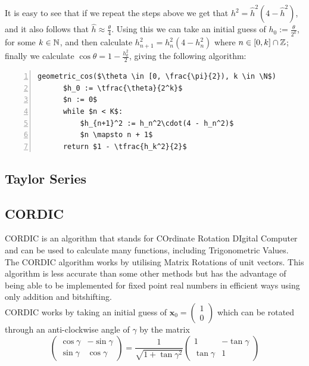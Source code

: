It is easy to see that if we repeat the steps above we get that \(h^2 = \hat{h}^2(4 - \hat{h}^2)\), and it also follows that \(\hat{h} \approx \frac{\theta}{4}\). Using this we can take an initial guess of \(h_0 := \frac{\theta}{2^k}\), for some \(k \in \mathbb{N}\), and then calculate \(h_{n+1}^2 = h_n^2(4 - h_n^2)\) where \(n \in [0, k] \cap \mathbb{Z}\); finally we calculate \(\cos\theta = 1 - \frac{h_k^2}{2}\), giving the following algorithm:
  
\begin{lstlisting}[numbers=left,frame=single,mathescape,caption={Geometric calculation of \(\cos\)},label={PCD_"Gometric Cos"}]
  geometric_cos($\theta \in [0, \frac{\pi}{2}), k \in \N$)
      $h_0 := \tfrac{\theta}{2^k}$
      $n := 0$
      while $n < K$:
          $h_{n+1}^2 := h_n^2\cdot(4 - h_n^2)$
          $n \mapsto n + 1$
      return $1 - \tfrac{h_k^2}{2}$
\end{lstlisting}

\subsection{Taylor Series}
\subsection{CORDIC}
CORDIC is an algorithm that stands for COrdinate Rotation DIgital Computer and can be used to calculate many functions, including Trigonometric Values. The CORDIC algorithm works by utilising Matrix Rotations of unit vectors. This algorithm is less accurate than some other methods but has the advantage of being able to be implemented for fixed point real numbers in efficient ways using only addition and bitshifting.\\

CORDIC works by taking an initial guess of
\begin{math}
	\mathbf{x}_0 = \left( 
		\begin{array}{c}
			1 \\
			0
		\end{array} \right)
\end{math}
which can be rotated through an anti-clockwise angle of $\gamma$ by the matrix
\begin{displaymath}
	\left( \begin{array}{cc}
		\cos{\gamma} & -\sin{\gamma} \\
		\sin{\gamma} &  \cos{\gamma}
	\end{array} \right)
	= \frac{1}{\sqrt{1 + \tan{\gamma}^2}} \left( \begin{array}{cc}
		1 & -\tan{\gamma} \\
		\tan{\gamma} & 1
	\end{array} \right)
\end{displaymath}

